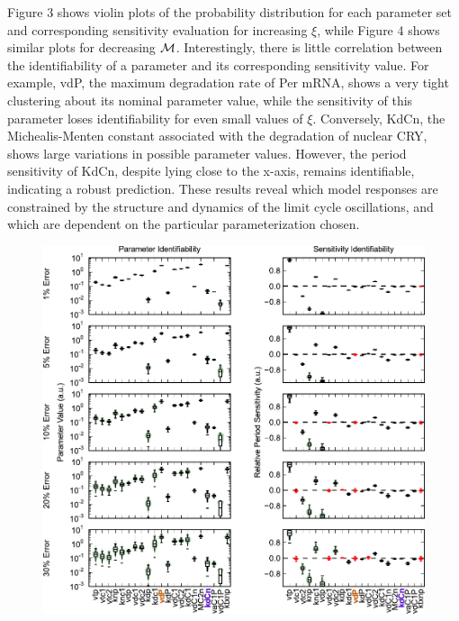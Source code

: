 Figure 3 shows violin plots of the probability distribution for each parameter
set and corresponding sensitivity evaluation for increasing $\xi$, while Figure
4 shows similar plots for decreasing $\cal M$.  Interestingly, there is little
correlation between the identifiability of a parameter and its corresponding
sensitivity value. For example, vdP, the maximum degradation rate of Per mRNA,
shows a very tight clustering about its nominal parameter value, while the
sensitivity of this parameter loses identifiability for even small values of
$\xi$. Conversely, KdCn, the Michealis-Menten constant associated with the
degradation of nuclear CRY, shows large variations in possible parameter
values. However, the period sensitivity of KdCn, despite lying close to the
x-axis, remains identifiable, indicating a robust prediction.  These results
reveal which model responses are constrained by the structure and dynamics of
the limit cycle oscillations, and which are dependent on the particular
parameterization chosen.

\begin{figure}[h]
  \centering
  \includegraphics{chap3/figures/fig3.pdf}
  \label{fig:3_3}
\end{figure}

